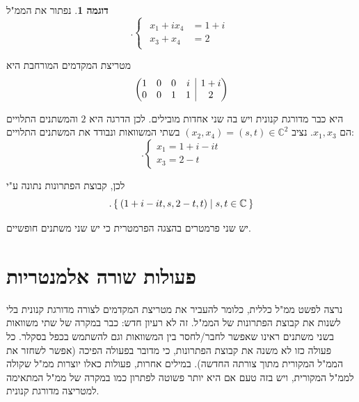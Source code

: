 \documentclass[12pt]{report}
\theoremstyle{plain}
\theoremstyle{definition}
\newtheorem{example}{דוגמה}[chapter]
\newcommand{\C}{\mathbb{C}}
\newcommand{\0}{\mathbf{0}}
\begin{document}
\begin{example}
נפתור את הממ"ל
$$
.\begin{cases}
\begin{aligned}
x_1+ix_4&=1+i\\
x_3+x_4&=2
\end{aligned}
\end{cases}
$$

מטריצת המקדמים המורחבת היא
$$
\left( \begin{array}{@{}cccc|c@{}}
	1 & 0 & 0 & i & 1+i\\
	0 & 0 & 1 & 1 & 2
\end{array} \right)
$$

היא כבר מדורגת קנונית ויש בה שני אחדות מובילים. לכן הדרגה היא $2$
והמשתנים התלויים הם $x_1,x_3$. נציב $(x_2,x_4)=(s,t)\in\C^{2}$
בשתי המשוואות ונבודד את המשתנים התלויים: 
$$
.\begin{cases}
x_1=1+i-it\\
x_3=2-t
\end{cases}
$$

לכן, קבוצת הפתרונות נתונה ע"י
$$
.\Set{(1+i-it,s,2-t,t)|s,t\in\C}
$$

יש שני פרמטרים בהצגה הפרמטרית כי יש שני משתנים חופשיים.
\end{example}

\section{פעולות שורה אלמנטריות}

נרצה לפשט ממ"ל כללית, כלומר להעביר את מטריצת המקדמים לצורה מדורגת קנונית בלי לשנות את קבוצת הפתרונות של הממ"ל.
זה לא רעיון חדש: כבר במקרה של שתי משוואות בשני משתנים ראינו שאפשר
לחבר/לחסר בין המשוואות וגם להשתמש בכפל בסקלר. כל פעולה כזו לא משנה
את קבוצת הפתרונות, כי מדובר בפעולה הפיכה (אפשר לשחזר את הממ"ל
המקורית מתוך צורתה החדשה). במילים אחרות, פעולות כאלו יוצרות ממ"ל
שקולה לממ"ל המקורית, ויש בזה טעם אם היא יותר פשוטה לפתרון כמו במקרה של ממ"ל המתאימה למטריצה מדורגת קנונית.
\end{document}
